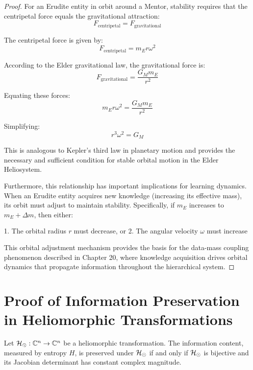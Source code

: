 \begin{proof}
For an Erudite entity in orbit around a Mentor, stability requires that the centripetal force equals the gravitational attraction:
\begin{equation}
F_{\text{centripetal}} = F_{\text{gravitational}}
\end{equation}

The centripetal force is given by:
\begin{equation}
F_{\text{centripetal}} = m_E r \omega^2
\end{equation}

According to the Elder gravitational law, the gravitational force is:
\begin{equation}
F_{\text{gravitational}} = \frac{G_M m_E}{r^2}
\end{equation}

Equating these forces:
\begin{equation}
m_E r \omega^2 = \frac{G_M m_E}{r^2}
\end{equation}

Simplifying:
\begin{equation}
r^3 \omega^2 = G_M
\end{equation}

This is analogous to Kepler's third law in planetary motion and provides the necessary and sufficient condition for stable orbital motion in the Elder Heliosystem.

Furthermore, this relationship has important implications for learning dynamics. When an Erudite entity acquires new knowledge (increasing its effective mass), its orbit must adjust to maintain stability. Specifically, if $m_E$ increases to $m_E + \Delta m$, then either:

1. The orbital radius $r$ must decrease, or
2. The angular velocity $\omega$ must increase

This orbital adjustment mechanism provides the basis for the data-mass coupling phenomenon described in Chapter 20, where knowledge acquisition drives orbital dynamics that propagate information throughout the hierarchical system.
\end{proof}

\section{Proof of Information Preservation in Heliomorphic Transformations}

\begin{theorem}
Let $\mathcal{H}_{\odot}: \mathbb{C}^n \to \mathbb{C}^n$ be a heliomorphic transformation. The information content, measured by entropy $H$, is preserved under $\mathcal{H}_{\odot}$ if and only if $\mathcal{H}_{\odot}$ is bijective and its Jacobian determinant has constant complex magnitude.
\end{theorem}

